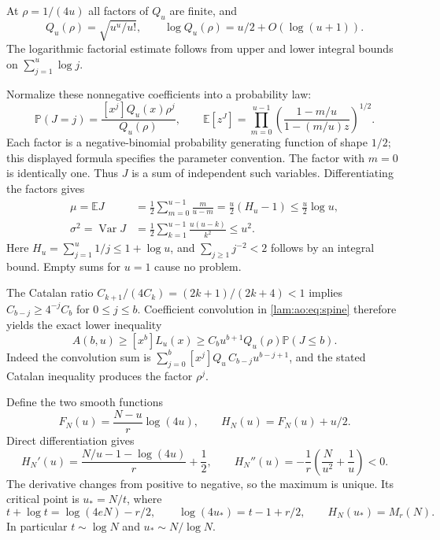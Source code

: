 \documentclass[11pt,a4paper]{article}
\numberwithin{equation}{section}
\theoremstyle{remark}
\newcommand{\Prob}{\mathbb P}
\newcommand{\E}{\mathbb E}
\DeclareMathOperator{\Var}{Var}
\begin{document}
At $\rho=1/(4u)$ all factors of $Q_u$ are finite, and
\begin{equation}\label{lam:ao:eq:Q}
 Q_u(\rho)=\sqrt{u^u/u!},\qquad
 \log Q_u(\rho)=u/2+O(\log(u+1)).
\end{equation}
The logarithmic factorial estimate follows from upper and lower integral bounds on $\sum_{j=1}^u\log j$.

Normalize these nonnegative coefficients into a probability law:
\begin{equation}\label{lam:ao:eq:J}
 \Prob(J=j)=\frac{[x^j]Q_u(x)\rho^j}{Q_u(\rho)},\qquad
 \E[z^J]=\prod_{m=0}^{u-1}
       \left(\frac{1-m/u}{1-(m/u)z}\right)^{1/2}.
\end{equation}
Each factor is a negative-binomial probability generating function of shape $1/2$; this displayed formula specifies the parameter convention. The factor with $m=0$ is identically one. Thus $J$ is a sum of independent such variables. Differentiating the factors gives
\begin{align}
 \mu=\E J&=\frac12\sum_{m=0}^{u-1}\frac m{u-m}
       =\frac u2(H_u-1)\le\frac u2\log u,\label{lam:ao:eq:mean}\\
 \sigma^2=\Var J&=\frac12\sum_{k=1}^{u-1}\frac{u(u-k)}{k^2}\le u^2.\label{lam:ao:eq:var}
\end{align}
Here $H_u=\sum_{j=1}^u1/j\le1+\log u$, and $\sum_{j\ge1}j^{-2}<2$ follows by an integral bound. Empty sums for $u=1$ cause no problem.

The Catalan ratio $C_{k+1}/(4C_k)=(2k+1)/(2k+4)<1$ implies $C_{b-j}\ge4^{-j}C_b$ for $0\le j\le b$. Coefficient convolution in \eqref{lam:ao:eq:spine} therefore yields the exact lower inequality
\begin{equation}\label{lam:ao:eq:convolution}
 A(b,u)\ge[x^b]L_u(x)
       \ge C_bu^{b+1}Q_u(\rho)\Prob(J\le b).
\end{equation}
Indeed the convolution sum is $\sum_{j=0}^b[x^j]Q_u\,C_{b-j}u^{b-j+1}$, and the stated Catalan inequality produces the factor $\rho^j$.

Define the two smooth functions
\begin{equation}\label{lam:ao:eq:FH}
 F_N(u)=\frac{N-u}{r}\log(4u),\qquad H_N(u)=F_N(u)+u/2.
\end{equation}
Direct differentiation gives
\[
 H_N'(u)=\frac{N/u-1-\log(4u)}r+\frac12,\qquad
 H_N''(u)=-\frac1r\left(\frac N{u^2}+\frac1u\right)<0.
\]
The derivative changes from positive to negative, so the maximum is unique. Its critical point is $u_*=N/t$, where
\begin{equation}\label{lam:ao:eq:saddle}
 t+\log t=\log(4eN)-r/2,\qquad
 \log(4u_*)=t-1+r/2,\qquad H_N(u_*)=M_r(N).
\end{equation}
In particular $t\sim\log N$ and $u_*\sim N/\log N$.
\end{document}

